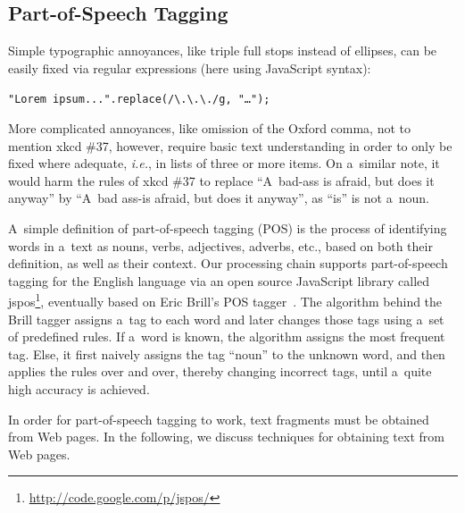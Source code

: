 \documentclass{sig-alternate}
\let\oldemph\emph
\renewcommand{\emph}[1]{\oldemph{\fontsize{9}{9}\selectfont #1}}
\begin{document}
\subsection{Part-of-Speech Tagging}
Simple typographic annoyances, like triple full stops instead of ellipses, can be easily fixed via regular expressions (here using JavaScript syntax):

\noindent \texttt{"Lorem ipsum...".replace(/\textbackslash.\textbackslash.\textbackslash./g, "\ldots");}

More complicated annoyances, like omission of the Oxford comma, not to mention xkcd \#37, however,
require basic text understanding in order to only be fixed where adequate, \emph{i.e.}, 
in lists of three or more items.
On a~similar note, it would harm the rules of xkcd \#37 to replace ``A~bad-ass is afraid, but does it anyway'' by ``A~bad ass-is afraid, but does it anyway'', as ``is'' is not a~noun.

\addtocounter{footnote}{1}

A~simple definition of part-of-speech tagging (POS) is the process of identifying words in a~text as nouns, verbs, adjectives, adverbs, etc., based on both their definition, as well as their context.
Our processing chain supports part-of-speech tagging for the English language via an open source JavaScript library called jspos\footnote{\url{http://code.google.com/p/jspos/}},
eventually based on Eric Brill's POS tagger~\cite{brill1992simple}.
The algorithm behind the Brill tagger assigns a~tag to each word and later changes those tags using a~set of predefined rules.
If a~word is known, the algorithm assigns the most frequent tag.
Else, it first naively assigns the tag ``noun'' to the unknown word,
and then applies the rules over and over, thereby changing incorrect tags,
until a~quite high accuracy is achieved.

In order for part-of-speech tagging to work, text fragments must be obtained from Web pages.
In the following, we discuss techniques for obtaining text from Web pages.
\end{document}
